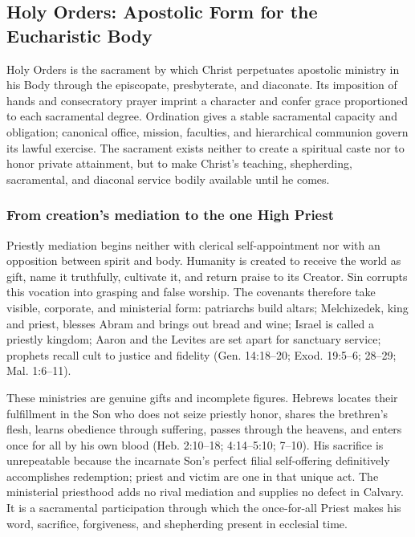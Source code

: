 \subsection{Holy Orders: Apostolic Form for the Eucharistic Body}

Holy Orders is the sacrament by which Christ perpetuates apostolic ministry in his Body through the episcopate, presbyterate, and diaconate. Its imposition of hands and consecratory prayer imprint a character and confer grace proportioned to each sacramental degree. Ordination gives a stable sacramental capacity and obligation; canonical office, mission, faculties, and hierarchical communion govern its lawful exercise. The sacrament exists neither to create a spiritual caste nor to honor private attainment, but to make Christ's teaching, shepherding, sacramental, and diaconal service bodily available until he comes.

\subsubsection{From creation's mediation to the one High Priest}

Priestly mediation begins neither with clerical self-appointment nor with an opposition between spirit and body. Humanity is created to receive the world as gift, name it truthfully, cultivate it, and return praise to its Creator. Sin corrupts this vocation into grasping and false worship. The covenants therefore take visible, corporate, and ministerial form: patriarchs build altars; Melchizedek, king and priest, blesses Abram and brings out bread and wine; Israel is called a priestly kingdom; Aaron and the Levites are set apart for sanctuary service; prophets recall cult to justice and fidelity (Gen. 14:18--20; Exod. 19:5--6; 28--29; Mal. 1:6--11).

These ministries are genuine gifts and incomplete figures. Hebrews locates their fulfillment in the Son who does not seize priestly honor, shares the brethren's flesh, learns obedience through suffering, passes through the heavens, and enters once for all by his own blood (Heb. 2:10--18; 4:14--5:10; 7--10). His sacrifice is unrepeatable because the incarnate Son's perfect filial self-offering definitively accomplishes redemption; priest and victim are one in that unique act. The ministerial priesthood adds no rival mediation and supplies no defect in Calvary. It is a sacramental participation through which the once-for-all Priest makes his word, sacrifice, forgiveness, and shepherding present in ecclesial time.

